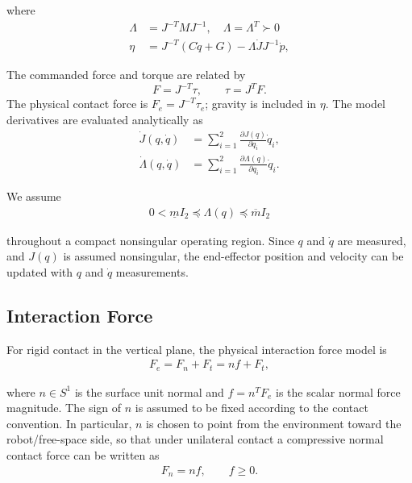 \documentclass[10pt,journal,letterpaper]{IEEEtran}
\begin{document}
where
\begin{equation}\label{eq:cartesian-model}
\begin{aligned}
\Lambda &= J^{-T}MJ^{-1}, \quad \Lambda=\Lambda^T \succ {0} \\
\eta &= J^{-T}(C\dot q+G)-\Lambda\dot J J^{-1}\dot p,
\end{aligned}
\end{equation}

The commanded force and torque are related by
\begin{equation}\label{eq:torque-map}
F=J^{-T}\tau,\qquad \tau=J^TF.
\end{equation}
The physical contact force is $F_e=J^{-T}\tau_e$; gravity is included in $\eta$.
The model derivatives are evaluated analytically as
\begin{equation}\label{eq:model-derivatives}
\begin{aligned}
\dot J(q,\dot q)&=\sum_{i=1}^{2}\frac{\partial J(q)}{\partial q_i}\dot q_i,\\
\dot\Lambda(q,\dot q)&=\sum_{i=1}^{2}\frac{\partial\Lambda(q)}{\partial q_i}\dot q_i.
\end{aligned}
\end{equation} 

We assume 
\begin{equation}\label{eq:inertia-bounds}
\begin{aligned}
0<\underline m I_2
\preceq
\Lambda(q)
\preceq
\overline m I_2
\end{aligned}
\end{equation}

throughout a compact nonsingular operating region. Since $q$ and $\dot q$ are measured, and $J(q)$ is assumed nonsingular, the end-effector position and velocity can be updated with $q$ and $\dot q$ measurements.

\subsection{Interaction Force}

For rigid contact in the vertical plane, the physical interaction force model is
\begin{align*}
F_{e}=F_{n}+F_{t}=nf+F_{t},
\end{align*}

where $n\in S^{1}$ is the surface unit normal and $f=n^{T}F_{e}$ is the scalar normal force magnitude. The sign of $n$ is assumed to be fixed according to the contact convention. In particular, $n$ is chosen to point from the environment toward the robot/free-space side, so that under unilateral contact a compressive normal contact force can be written as
\begin{align*}
F_{n}=nf, \qquad f\geq 0.
\end{align*}
\end{document}
